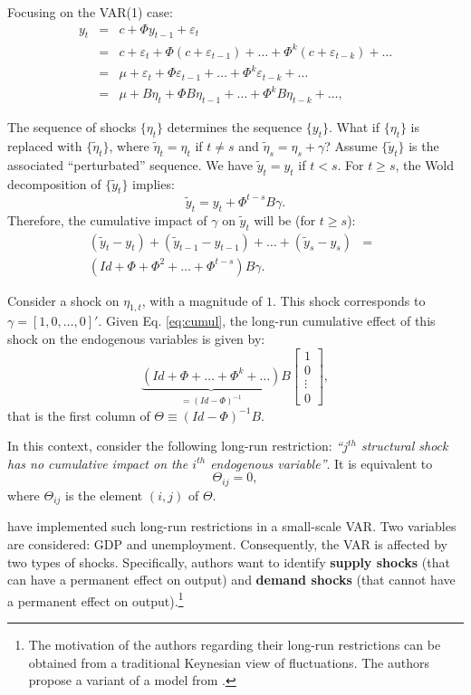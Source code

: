 \documentclass[
  12pt,
]{book}
\theoremstyle{definition}
\theoremstyle{definition}
\theoremstyle{definition}
\theoremstyle{definition}
\theoremstyle{remark}
\begin{document}
Focusing on the VAR(1) case:
\begin{eqnarray*}
y_{t} &=& c+\Phi y_{t-1}+\varepsilon_{t}\\
& = & c+\varepsilon_{t}+\Phi(c+\varepsilon_{t-1})+\ldots+\Phi^{k}(c+\varepsilon_{t-k})+\ldots \\
& = & \mu +\varepsilon_{t}+\Phi\varepsilon_{t-1}+\ldots+\Phi^{k}\varepsilon_{t-k}+\ldots \\
& = & \mu +B\eta_{t}+\Phi B\eta_{t-1}+\ldots+\Phi^{k}B\eta_{t-k}+\ldots,
\end{eqnarray*}

The sequence of shocks \(\{\eta_t\}\) determines the sequence \(\{y_t\}\). What if \(\{\eta_t\}\) is replaced with \(\{\tilde{\eta}_t\}\), where \(\tilde{\eta}_t=\eta_t\) if \(t \ne s\) and \(\tilde{\eta}_s=\eta_s + \gamma\)? Assume \(\{\tilde{y}_t\}\) is the associated ``perturbated'' sequence. We have \(\tilde{y}_t = y_t\) if \(t<s\). For \(t \ge s\), the Wold decomposition of \(\{\tilde{y}_t\}\) implies:
\[
\tilde{y}_t = y_t + \Phi^{t-s} B \gamma.
\]
Therefore, the cumulative impact of \(\gamma\) on \(\tilde{y}_t\) will be (for \(t \ge s\)):
\begin{eqnarray}
(\tilde{y}_t - y_t) +  (\tilde{y}_{t-1} - y_{t-1}) + \dots +  (\tilde{y}_s - y_s) &=& \nonumber \\
(Id + \Phi + \Phi^2 + \dots + \Phi^{t-s}) B \gamma.&& \label{eq:cumul}
\end{eqnarray}

Consider a shock on \(\eta_{1,t}\), with a magnitude of \(1\). This shock corresponds to \(\gamma = [1,0,\dots,0]'\). Given Eq. \eqref{eq:cumul}, the long-run cumulative effect of this shock on the endogenous variables is given by:
\[
\underbrace{(Id+\Phi+\ldots+\Phi^{k}+\ldots)}_{=(Id - \Phi)^{-1}}B\left[\begin{array}{c}
1\\
0\\
\vdots\\
0\end{array}\right],
\]
that is the first column of \(\Theta \equiv (Id - \Phi)^{-1}B\).

In this context, consider the following long-run restriction: \emph{``\(j^{th}\) structural shock has no cumulative impact on the \(i^{th}\) endogenous variable''}. It is equivalent to
\[
\Theta_{ij}=0,
\]
where \(\Theta_{ij}\) is the element \((i,j)\) of \(\Theta\).

\citet{Blanchard_Quah_1989} have implemented such long-run restrictions in a small-scale VAR. Two variables are considered: GDP and unemployment. Consequently, the VAR is affected by two types of shocks. Specifically, authors want to identify \textbf{supply shocks} (that can have a permanent effect on output) and \textbf{demand shocks} (that cannot have a permanent effect on output).\footnote{The motivation of the authors regarding their long-run restrictions can be obtained from a traditional Keynesian view of fluctuations. The authors propose a variant of a model from \citet{Fischer_1977}.
}
\end{document}
